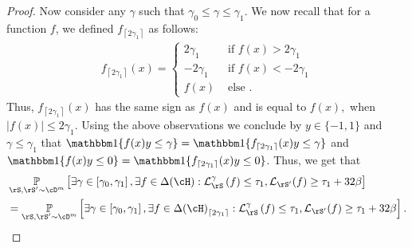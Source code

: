 \begin{proof}
Now consider any $ \gamma $ such that $\gamma_{0}\leq \gamma\leq \gamma_{1}.$ We now recall that for a function $ f $, we defined $ f_{\left\lceil2\gamma_{1}\right\rceil} $ as follows:
\begin{align*}
    f_{\left\lceil2\gamma_{1}\right\rceil}(x)=\begin{cases}
        2\gamma_{1} &\text{ if }f(x)> 2\gamma_{1}
        \\
        -2\gamma_{1} &\text{ if } f(x)<- 2\gamma_{1}
        \\
        f(x) &\text{ else }.
    \end{cases}
\end{align*}
Thus,  $ f_{\left\lceil2\gamma_{1}\right\rceil}(x) $ has the same sign as $ f(x) $  and is equal to $ f(x), $ when $ |f(x)|\leq 2\gamma_{1}.$  Using the above observations we conclude by $ y\in\{  -1,1\}  $ and $ \gamma\leq \gamma_{1} $   that $ \ind\{   f(x)y\leq \gamma \}=\ind\{   f_{\left\lceil2\gamma_{1}\right\rceil}(x)y\leq \gamma\}$  and   $ \ind\{   f(x)y\leq 0 \}=\ind\{   f_{\left\lceil2\gamma_{1}\right\rceil}(x)y\leq 0 \}$. Thus, we get that
\begin{align}\label{eq:marginbound19}
    &\p_{\rS,\rS'\sim\cD^{m}}\left[ \exists \gamma \in \left[\gamma_{0},\gamma_{1}\right],\exists f\in \dlh :  \ls_{\rS}^{\gamma}\left(f\right)
    \leq \tau_{1}, \ls_{\rS'}(f) \geq 
    \tau_{1} 
        + 32\beta\right]
        \\
        &=\p_{\rS,\rS'\sim\cD^{m}}\left[ \exists \gamma \in \left[\gamma_{0},\gamma_{1}\right],\exists f\in \dlh_{\left\lceil2\gamma_{1}\right\rceil} :  \ls_{\rS}^{\gamma}\left(f\right)
        \leq \tau_{1}, \ls_{\rS'}(f) \geq 
        \tau_{1} 
            + 32\beta\right]. \nonumber
\end{align}


\end{proof}
